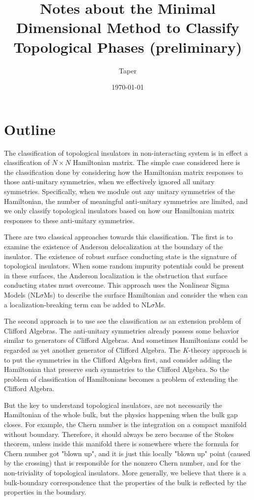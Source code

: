 \documentclass{article}
\title{Notes about the Minimal Dimensional Method to Classify
Topological Phases (preliminary)}
\date{\today}
\author{Taper}
\begin{document}
\maketitle
{}
\tableofcontents

\section{Outline}
\label{sec:Outline}
 
The classification of topological insulators in non-interacting system is in
effect a classification of $N\times N$ Hamiltonian matrix. %
The simple case considered here
is the classification done by considering how the Hamiltonian matrix responses
to those anti-unitary symmetries, when we effectively ignored all unitary
symmetries. Specifically, when we module out any unitary symmetries of the
Hamiltonian, the number of meaningful anti-unitary symmetries are limited, and
we only classify topological insulators based on how our Hamiltonian matrix
responses to these anti-unitary symmetries.

There are two classical approaches towards this classification. The first
\cite{Schnyder2008} is to examine the existence of Anderson delocalization at
the boundary of the insulator. The existence of robust surface conducting state
is the signature of topological insulators. When some random impurity potentials
could be present in these surfaces, the Anderson localization is the obstruction
that surface conducting states must overcome. This approach uses the Nonlinear
Sigma Models (NL$\sigma$Ms) to describe the surface Hamiltonian and consider the
when can a localization-breaking term can be added to NL$\sigma$Ms.

The second approach\cite{Kitaev2009a} is to use see the classification as an
extension problem of Clifford Algebras. The anti-unitary symmetries already
possess some behavior similar to generators of Clifford Algebras. And sometimes
Hamiltonians could be regarded as yet another generator of Clifford
Algebra\cite{Morimoto2013}. The $K$-theory approach is to put the symmetries in
the Clifford Algebra first, and consider adding the Hamiltonian that preserve
such symmetries to the Clifford Algebra. So the problem of classification of
Hamiltonians becomes a problem of extending the Clifford Algebra.

But the key to understand topological insulators, are not necessarily the
Hamiltonian of the whole bulk, but the physics happening when the bulk gap
closes. For example, the Chern number is the integration on a compact manifold
without boundary. Therefore, it should always be zero because of the Stokes
theorem, unless inside this manifold there is somewhere where the formula for
Chern number got "blown up", and it is just this locally "blown up" point
(caused by the crossing) that is responsible for the nonzero Chern number, and
for the non-triviality of topological insulators. More generally, we believe
that there is a bulk-boundary correspondence that the properties of the bulk is
reflected by the properties in the boundary.
\end{document}
